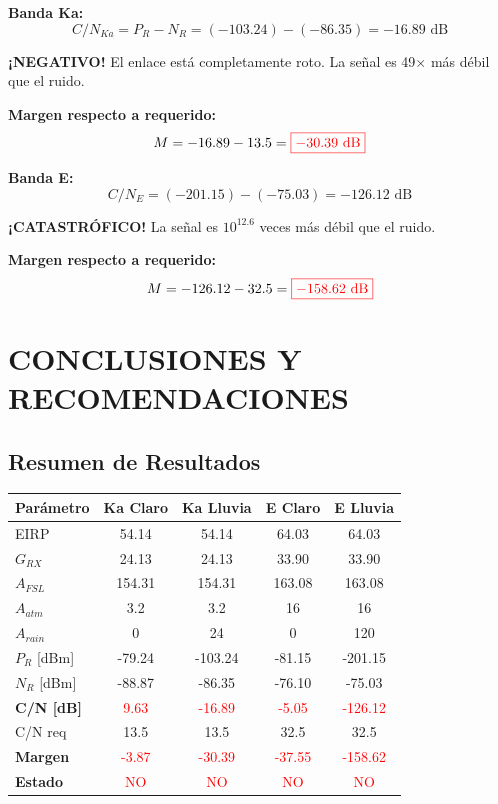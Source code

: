 \documentclass[a4paper,10pt]{article}
\begin{document}
\textbf{Banda Ka:}
$$C/N_{Ka} = P_R - N_R = (-103.24) - (-86.35) = \boxed{-16.89 \text{ dB}}$$

\textbf{¡NEGATIVO!} El enlace está completamente roto. La señal es 49× más débil que el ruido.

\textbf{Margen respecto a requerido:}
$$M = -16.89 - 13.5 = \textcolor{red}{\boxed{-30.39 \text{ dB}}}$$

\textbf{Banda E:}
$$C/N_E = (-201.15) - (-75.03) = \boxed{-126.12 \text{ dB}}$$

\textbf{¡CATASTRÓFICO!} La señal es $10^{12.6}$ veces más débil que el ruido.

\textbf{Margen respecto a requerido:}
$$M = -126.12 - 32.5 = \textcolor{red}{\boxed{-158.62 \text{ dB}}}$$

\newpage
\section{CONCLUSIONES Y RECOMENDACIONES}

\subsection{Resumen de Resultados}

\begin{center}
\begin{tabular}{|l|c|c|c|c|}
\hline
\textbf{Parámetro} & \textbf{Ka Claro} & \textbf{Ka Lluvia} & \textbf{E Claro} & \textbf{E Lluvia} \\
\hline
EIRP & 54.14 & 54.14 & 64.03 & 64.03 \\
$G_{RX}$ & 24.13 & 24.13 & 33.90 & 33.90 \\
$A_{FSL}$ & 154.31 & 154.31 & 163.08 & 163.08 \\
$A_{atm}$ & 3.2 & 3.2 & 16 & 16 \\
$A_{rain}$ & 0 & 24 & 0 & 120 \\
\hline
$P_R$ [dBm] & -79.24 & -103.24 & -81.15 & -201.15 \\
$N_R$ [dBm] & -88.87 & -86.35 & -76.10 & -75.03 \\
\hline
\textbf{C/N [dB]} & \textcolor{red}{9.63} & \textcolor{red}{-16.89} & \textcolor{red}{-5.05} & \textcolor{red}{-126.12} \\
C/N req & 13.5 & 13.5 & 32.5 & 32.5 \\
\textbf{Margen} & \textcolor{red}{-3.87} & \textcolor{red}{-30.39} & \textcolor{red}{-37.55} & \textcolor{red}{-158.62} \\
\hline
\textbf{Estado} & \textcolor{red}{NO} & \textcolor{red}{NO} & \textcolor{red}{NO} & \textcolor{red}{NO} \\
\hline
\end{tabular}
\end{center}
\end{document}
